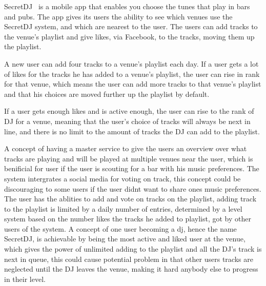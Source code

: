 SecretDJ~\cite{secretDJ} is a mobile app that enables you choose the tunes that play in bars and pubs. The app gives its users the ability to see which venues use the SecretDJ system, and which are nearest to the user. The users can add tracks to the venue's playlist and give likes, via Facebook, to the tracks, moving them up the playlist.

A new user can add four tracks to a venue's playlist each day. If a user gets a lot of likes for the tracks he has added to a venue's playlist, the user can rise in rank for that venue, which means the user can add more tracks to that venue's playlist and that his choices are moved further up the playlist by default.

If a user gets enough likes and is active enough, the user can rise to the rank of DJ for a venue, meaning that the user's choice of tracks will always be next in line, and there is no limit to the amount of tracks the DJ can add to the playlist.

A concept of having a master service to give the users an overview over what tracks are playing and will be played at multiple venues near the user, which is benificial for user if the user is scouting for a bar with his music preferences. The system intergrates a social media for voting on track, this concept could be discouraging to some users if the user didnt want to share ones music preferences. The user has the ablities to add and vote on tracks on the playlist, adding track to the playlist is limited by a daily number of entries, determined by a level system based on the number likes the tracks he added to playlist, got by other users of the system. A concept of one user becoming a dj, hence the name SecretDJ, is achievable by being the most active and liked user at the venue, which gives the power of unlimited adding to the playlist and all the DJ's track is next in queue, this could cause potential problem in that other users tracks are neglected until the DJ leaves the venue, making it hard anybody else to progress in their level.
